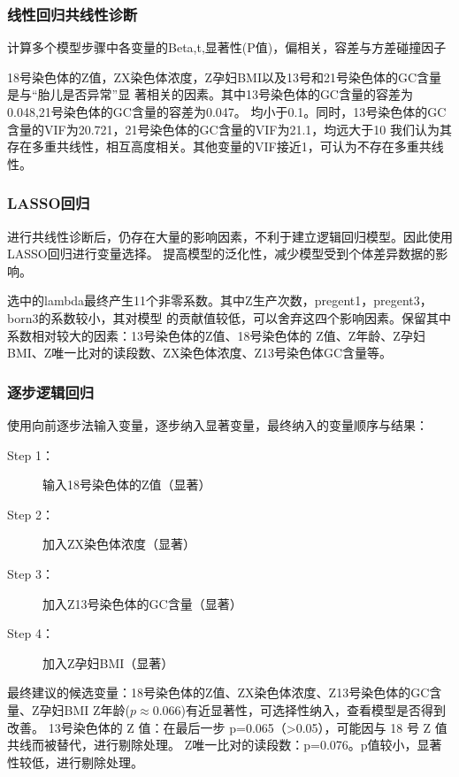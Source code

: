 \documentclass[withoutpreface,notoc]{cumcmthesis}
\begin{document}
	\subsubsection{线性回归共线性诊断}
	计算多个模型步骤中各变量的Beta,t,显著性(P值)，偏相关，容差与方差碰撞因子











	18号染色体的Z值，ZX染色体浓度，Z孕妇BMI以及13号和21号染色体的GC含量是与“胎儿是否异常”显
	著相关的因素。其中13号染色体的GC含量的容差为0.048,21号染色体的GC含量的容差为0.047。
	均小于0.1。同时，13号染色体的GC含量的VIF为20.721，21号染色体的GC含量的VIF为21.1，均远大于10
	我们认为其存在多重共线性，相互高度相关。其他变量的VIF接近1，可认为不存在多重共线性。



	\subsubsection{LASSO回归}
	进行共线性诊断后，仍存在大量的影响因素，不利于建立逻辑回归模型。因此使用LASSO回归进行变量选择。
	提高模型的泛化性，减少模型受到个体差异数据的影响。




	选中的lambda最终产生11个非零系数。其中Z生产次数，pregent1，pregent3，born3的系数较小，其对模型
	的贡献值较低，可以舍弃这四个影响因素。保留其中系数相对较大的因素：13号染色体的Z值、18号染色体的
	Z值、Z年龄、Z孕妇BMI、Z唯一比对的读段数、ZX染色体浓度、Z13号染色体GC含量等。


	\subsubsection{逐步逻辑回归}
	使用向前逐步法输入变量，逐步纳入显著变量，最终纳入的变量顺序与结果：
	\begin{description}
		\item[Step 1：] 输入18号染色体的Z值（显著）
		\item[Step 2：] 加入ZX染色体浓度（显著）
		\item[Step 3：] 加入Z13号染色体的GC含量（显著）
		\item[Step 4：] 加入Z孕妇BMI（显著） 
	\end{description}


	最终建议的候选变量：18号染色体的Z值、ZX染色体浓度、Z13号染色体的GC含量、Z孕妇BMI
	Z年龄($ p \approx 0.066 $)有近显著性，可选择性纳入，查看模型是否得到改善。
	13号染色体的 Z 值：在最后一步 p=0.065（>0.05），可能因与 18 号 Z 值共线而被替代，进行剔除处理。
	Z唯一比对的读段数：p=0.076。p值较小，显著性较低，进行剔除处理。
\end{document}

